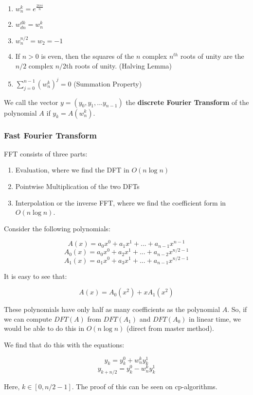 \documentclass[12pt,letterpaper]{article}
\theoremstyle{definition}
\begin{document}
\begin{enumerate}
  \item $w_n^k = e^{\frac{2k\pi i}{n}}$
  \item $w_{dn}^{dk} = w_{n}^k$
  \item $w_{n}^{n/2} = w_2 = -1$
  \item If $n >0$ is even, then the squares of the $n$ complex $n^{th}$ roots of unity are the $n/2$ complex $n/2$th roots of unity. (Halving Lemma)
  \item $\sum_{j=0}^{n-1} (w_{n}^{k})^j = 0$ (Summation Property)
\end{enumerate}

We call the vector $y = (y_0,y_1,...y_{n-1})$ the \textbf{discrete Fourier Transform}  of the polynomial $A$ if $y_k = A(w_n^k)$.

\subsubsection{Fast Fourier Transform}

FFT consists of three parts:

\begin{enumerate}
  \item Evaluation, where we find the DFT in $O(n\log n)$
  \item Pointwise Multiplication of the two DFTs
  \item Interpolation or the inverse FFT, where we find the coefficient form in $O(n \log n)$.
\end{enumerate}

Consider the following polynomials:

\[A(x) = a_0x^0 + a_1x^1 + ... + a_{n-1}x^{n-1}\]
\[A_0(x) = a_0x^0 + a_2x^1 + ... + a_{n-2}x^{n/2-1}\]
\[A_1(x) = a_1x^0 + a_3x^1 + ... + a_{n-1}x^{n/2-1}\]

It is easy to see that:

\[A(x) = A_0(x^2) + xA_1(x^2)\]

These polynomials have only half as many coefficients as the polynomial $A$. So, if we can compute $DFT(A)$ from $DFT(A_1)$ and $DFT(A_0)$ in linear time, we would be able to do this in $O(n \log n)$ (direct from master method).

We find that do this with the equations:

\[y_k = y_k^0 + w_n^k y_k^1\]
\[y_{k+n/2} = y_k^0 - w_n^k y_k^1\]

Here, $k \in [0,n/2-1]$. The proof of this can be seen on cp-algorithms.
\end{document}
